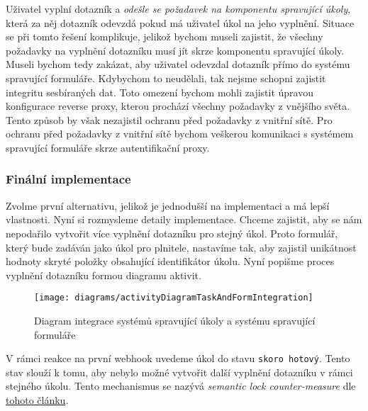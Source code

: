 Uživatel vyplní dotazník a \emph{odešle se požadavek na komponentu spravující úkoly}, která za něj dotazník odevzdá pokud má uživatel úkol na jeho vyplnění.
Situace se při tomto řešení komplikuje, jelikož bychom museli zajistit, že všechny požadavky na vyplnění dotazníku musí jít skrze komponentu spravující úkoly.
Museli bychom tedy zakázat, aby uživatel odevzdal dotazník přímo do systému spravující formuláře.
Kdybychom to neudělali, tak nejsme schopni zajistit integritu sesbíraných dat.
Toto omezení bychom mohli zajistit úpravou konfigurace reverse proxy, kterou prochází všechny požadavky z vnějšího světa.
Tento způsob by však nezajistil ochranu před požadavky z vnitřní sítě.
Pro ochranu před požadavky z vnitřní sítě bychom veškerou komunikaci s systémem spravující formuláře skrze autentifikační proxy.

\subsubsection{Finální implementace}\label{subsubsec:finalni-implementace}

Zvolme první alternativu, jelikož je jednodušší na implementaci a má lepší vlastnosti.
Nyní si rozmysleme detaily implementace.
Chceme zajistit, aby se nám nepodařilo vytvořit více vyplnění dotazníku pro stejný úkol.
Proto formulář, který bude zadáván jako úkol pro plnitele, nastavíme tak, aby zajistil unikátnost hodnoty skryté položky obsahující identifikátor úkolu.
Nyní popišme proces vyplnění dotazníku formou diagramu aktivit.

\begin{figure}[H]
    \centering
    \texttt{[image: diagrams/activityDiagramTaskAndFormIntegration]}
    \caption{Diagram integrace systémů spravující úkoly a systému spravující formuláře}\label{fig:activity-diagram-task-and-form-integration}
\end{figure}

V rámci reakce na první webhook uvedeme úkol do stavu \texttt{skoro hotový}.
Tento stav slouží k tomu, aby nebylo možné vytvořit další vyplnění dotazníku v rámci stejného úkolu.
Tento mechanismus se nazývá \emph{semantic lock counter-measure} dle \href{https://microservices.io/post/microservices/2019/07/09/developing-sagas-part-1.html}{tohoto článku}.

